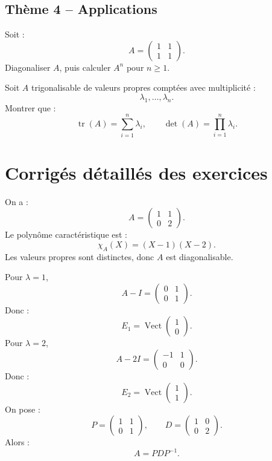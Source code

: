 \documentclass[11pt,a4paper]{article}
\newcommand{\Vect}{\operatorname{Vect}}
\newcommand{\tr}{\operatorname{tr}}
\begin{document}
\subsection*{Thème 4 -- Applications}

\begin{exercicebox}[11]
Soit :
\[
A=
\begin{pmatrix}
1&1\\
1&1
\end{pmatrix}.
\]
Diagonaliser \(A\), puis calculer \(A^n\) pour \(n\geq1\).
\end{exercicebox}

\begin{exercicebox}[12]
Soit \(A\) trigonalisable de valeurs propres comptées avec multiplicité :
\[
\lambda_1,\dots,\lambda_n.
\]
Montrer que :
\[
\tr(A)=\sum_{i=1}^n\lambda_i,
\qquad
\det(A)=\prod_{i=1}^n\lambda_i.
\]
\end{exercicebox}

\newpage
\section{Corrigés détaillés des exercices}

\begin{correctionbox}[1]
On a :
\[
A=
\begin{pmatrix}
1&1\\
0&2
\end{pmatrix}.
\]
Le polynôme caractéristique est :
\[
\chi_A(X)=(X-1)(X-2).
\]
Les valeurs propres sont distinctes, donc \(A\) est diagonalisable.

Pour \(\lambda=1\),
\[
A-I=
\begin{pmatrix}
0&1\\
0&1
\end{pmatrix}.
\]
Donc :
\[
E_1=\Vect
\begin{pmatrix}
1\\0
\end{pmatrix}.
\]
Pour \(\lambda=2\),
\[
A-2I=
\begin{pmatrix}
-1&1\\
0&0
\end{pmatrix}.
\]
Donc :
\[
E_2=\Vect
\begin{pmatrix}
1\\1
\end{pmatrix}.
\]
On pose :
\[
P=
\begin{pmatrix}
1&1\\
0&1
\end{pmatrix},
\qquad
D=
\begin{pmatrix}
1&0\\
0&2
\end{pmatrix}.
\]
Alors :
\[
A=PDP^{-1}.
\]
\end{correctionbox}
\end{document}
